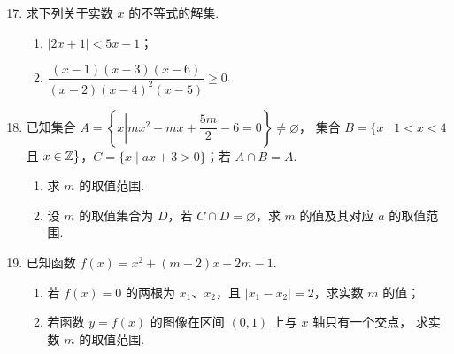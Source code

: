 \documentclass[a4paper,11pt]{article}
\begin{document}
\begin{enumerate}
\setcounter{enumi}{16}

\item 求下列关于实数 $x$ 的不等式的解集.

\begin{enumerate}[label=(\arabic*)]
\item $|2x+1|<5x-1$；
\item $\dfrac{(x-1)(x-3)(x-6)}{(x-2)(x-4)^2(x-5)}\geqslant0$.
\end{enumerate}

\ifanswer
\solbegin
{}
\step{所以不等式的解集为 $[1,2)\cup[3,4)\cup(4,5)\cup[6,+\infty)$.}
\solend

\fi

\ansspace[6]

\item 已知集合 $A=\left\{x\left|mx^2-mx+\dfrac{5m}2-6=0\right.\right\}\neq\varnothing$，
集合 $B=\{x\mid1<x<4$ 且 $x\in\mathbb{Z}\}$，$C=\{x\mid ax+3>0\}$；若 $A\cap B=A$.

\begin{enumerate}[label=(\arabic*)]
\item 求 $m$ 的取值范围.
\item 设 $m$ 的取值集合为 $D$，若 $C\cap D=\varnothing$，求 $m$ 的值及其对应 $a$ 的取值范围.
\end{enumerate}


\ansspace[8]

\item 已知函数 $f(x)=x^2+(m-2)x+2m-1$.

\begin{enumerate}[label=(\arabic*)]
\item 若 $f(x)=0$ 的两根为 $x_1$、$x_2$，且 $|x_1-x_2|=2$，求实数 $m$ 的值；
\item 若函数 $y=f(x)$ 的图像在区间 $(0,1)$ 上与 $x$ 轴只有一个交点，
求实数 $m$ 的取值范围.
\end{enumerate}


\end{enumerate}
\end{document}
